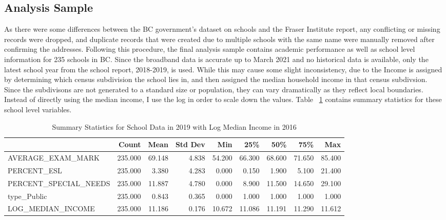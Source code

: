 \documentclass[stu, floatsintext]{apa7}
\begin{document}
    \subsection{Analysis Sample}
    As there were some differences between the BC government's dataset on schools and the Fraser Institute report, any conflicting or missing records were dropped, and duplicate records that were created due to multiple schools with the same name were manually removed after confirming the addresses. Following this procedure, the final analysis sample contains academic performance as well as school level information for 235 schools in BC. Since the broadband data is accurate up to March 2021 and no historical data is available, only the latest school year from the school report, 2018-2019, is used. While this may cause some slight inconsistency, due to the Income is assigned by determining which census subdivision the school lies in, and then assigned the median household income in that census subdivsion. Since the subdivisons are not generated to a standard size or population, they can vary dramatically as they reflect local boundaries. Instead of directly using the median income, I use the log in order to scale down the values. Table ~\ref{tab:fraserSummary} contains summary statistics for these school level variables.

\begin{table}[]
    \caption{Summary Statistics for School Data in 2019 with Log Median Income in 2016}
    \label{tab:fraserSummary}
    \centering
    \begin{adjustbox}{max width=\textwidth}
        \begin{tabular}{lrrrrrrrr}
            \hline
                                    & Count   & Mean   & Std Dev & Min    & 25\%   & 50\%   & 75\%   & Max    \\
            \hline
            AVERAGE\_EXAM\_MARK     & 235.000 & 69.148 & 4.838   & 54.200 & 66.300 & 68.600 & 71.650 & 85.400 \\
            PERCENT\_ESL            & 235.000 & 3.380  & 4.283   & 0.000  & 0.150  & 1.900  & 5.100  & 21.400 \\
            PERCENT\_SPECIAL\_NEEDS & 235.000 & 11.887 & 4.780   & 0.000  & 8.900  & 11.500 & 14.650 & 29.100 \\
            type\_Public            & 235.000 & 0.843  & 0.365   & 0.000  & 1.000  & 1.000  & 1.000  & 1.000  \\
            LOG\_MEDIAN\_INCOME     & 235.000 & 11.186 & 0.176   & 10.672 & 11.086 & 11.191 & 11.290 & 11.612 \\
            \hline
        \end{tabular}%
    \end{adjustbox}
\end{table}
\end{document}
